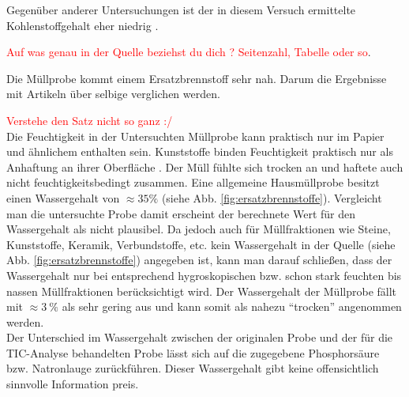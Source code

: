 Gegenüber anderer Untersuchungen ist der in diesem Versuch ermittelte Kohlenstoffgehalt eher niedrig \cite{Schwarzboeck2018}.

\textcolor{red}{Auf was genau in der Quelle beziehst du dich ? Seitenzahl, Tabelle oder so}. 

Die Müllprobe kommt einem Ersatzbrennstoff sehr nah. Darum die Ergebnisse mit Artikeln über selbige verglichen werden. 

\textcolor{red}{Verstehe den Satz nicht so ganz :/} \\

Die Feuchtigkeit in der Untersuchten Müllprobe kann praktisch nur im Papier und ähnlichem enthalten sein. Kunststoffe binden Feuchtigkeit praktisch nur als Anhaftung an ihrer Oberfläche \cite[S.3]{LLA_Abfallanalyse}. Der Müll fühlte sich trocken an und haftete auch nicht feuchtigkeitsbedingt zusammen.
Eine allgemeine Hausmüllprobe besitzt einen Wassergehalt von $\approx 35\%$  (siehe Abb. \ref{fig:ersatzbrennstoffe}). Vergleicht man die untersuchte Probe damit erscheint der berechnete Wert für den Wassergehalt als nicht plausibel. Da jedoch auch für Müllfraktionen wie Steine, Kunststoffe, Keramik, Verbundstoffe, etc. kein Wassergehalt in der Quelle (siehe Abb. \ref{fig:ersatzbrennstoffe}) angegeben ist, kann man darauf schließen, dass der Wassergehalt nur bei entsprechend hygroskopischen bzw. schon stark feuchten bis nassen Müllfraktionen berücksichtigt wird. Der Wassergehalt der Müllprobe fällt mit $\approx \SI{3}{\percent}$ als sehr gering aus und kann somit als nahezu "`trocken"' angenommen werden.\\
Der Unterschied im Wassergehalt zwischen der originalen Probe und der für die TIC-Analyse behandelten Probe lässt sich auf die zugegebene Phosphorsäure bzw. Natronlauge zurückführen. Dieser Wassergehalt gibt keine offensichtlich sinnvolle Information preis.

